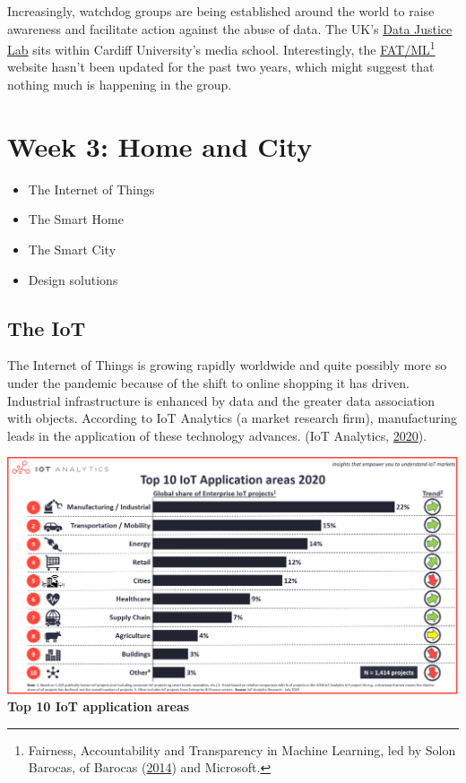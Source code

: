 \documentclass[
]{book}
\providecommand{\tightlist}{%
  \setlength{\itemsep}{0pt}\setlength{\parskip}{0pt}}
\begin{document}
Increasingly, watchdog groups are being established around the world to raise awareness and facilitate action against the abuse of data. The UK's \href{https://datajusticelab.org/}{Data Justice Lab} sits within Cardiff University's media school. Interestingly, the \href{https://www.fatml.org/}{FAT/ML}\footnote{Fairness, Accountability and Transparency in Machine Learning, led by Solon Barocas, of Barocas (\protect\hyperlink{ref-Barocas2014}{2014}) and Microsoft.} website hasn't been updated for the past two years, which might suggest that nothing much is happening in the group.

\hypertarget{week-3-home-and-city}{%
\chapter{Week 3: Home and City}\label{week-3-home-and-city}}

\begin{itemize}
\tightlist
\item
  The Internet of Things
\item
  The Smart Home
\item
  The Smart City
\item
  Design solutions
\end{itemize}

\hypertarget{the-iot}{%
\section{The IoT}\label{the-iot}}

The Internet of Things is growing rapidly worldwide and quite possibly more so under the pandemic because of the shift to online shopping it has driven. Industrial infrastructure is enhanced by data and the greater data association with objects. According to IoT Analytics (a market research firm), manufacturing leads in the application of these technology advances. (IoT Analytics, \protect\hyperlink{ref-IoTAnalytics2020}{2020}).

\includegraphics{images/Top-10-IoT-applications-in-2020-min.png}
\textbf{Top 10 IoT application areas}
\end{document}
